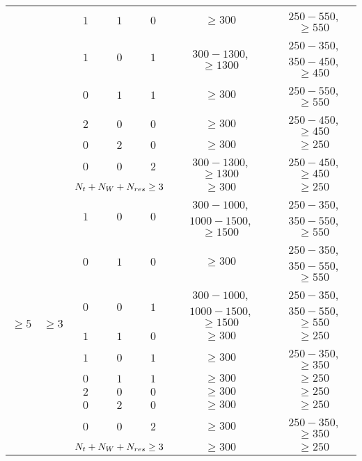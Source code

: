\begin{table}[!ht]
\begin{center}
{\begin{tabular}{|c|c|c|c|c|c|c|}
						  &					   & $1$	 		 & $1$					& $0$			& $\geq300$ 						& $250-550$, $\geq550$ \\
						  &					   & $1$	 		 & $0$					& $1$	  		& $300-1300$, $\geq1300$ & $250-350$, $350-450$, $\geq450$ \\
						  &					   & $0$			 & $1$					& $1$	  		& $\geq300$							& $250-550$, $\geq550$ \\
						  &					   & $2$	 		 & $0$					& $0$			& $\geq300$ 						& $250-450$, $\geq450$ \\
						  &					   & $0$	 		 & $2$					& $0$	  		& $\geq300$ 						& $\geq250$ \\
						  &					   & $0$			 & $0$					& $2$	  		& $300-1300$, $\geq1300$ & $250-450$, $\geq450$ \\
						  &					   & \multicolumn{3}{|c|}{$N_{t}+N_{W}+N_{res}\geq3$} & $\geq300$ 					   & $\geq250$ \\
	\hline
	\multirow{10}{*}{$\geq5$} & \multirow{10}{*}{$\geq3$} & $1$ & $0$ & $0$ & $300-1000$, $1000-1500$, $\geq1500$ & $250-350$, $350-550$, $\geq550$\\
						  &					   & $0$			 & $1$					& $0$			& $\geq300$ 						& $250-350$, $350-550$, $\geq550$\\
						  &					   & $0$			 & $0$				    & $1$	  		& $300-1000$, $1000-1500$, $\geq1500$ & $250-350$, $350-550$, $\geq550$\\
						  &					   & $1$	 		 & $1$					& $0$			& $\geq300$ 						& $\geq250$ \\
						  &					   & $1$	 		 & $0$					& $1$	  		& $\geq300$ 						& $250-350$, $\geq350$ \\
						  &					   & $0$			 & $1$					& $1$	  		& $\geq300$							& $\geq250$ \\
						  &					   & $2$	 		 & $0$					& $0$			& $\geq300$ 						& $\geq250$ \\
						  &					   & $0$	 		 & $2$					& $0$	  		& $\geq300$ 						& $\geq250$ \\
						  &					   & $0$			 & $0$					& $2$	  		& $\geq300$ 					   & $250-350$, $\geq350$ \\
						  &					   & \multicolumn{3}{|c|}{$N_{t}+N_{W}+N_{res}\geq3$} & $\geq300$ 					   & $\geq250$ \\
	\hline
\end{tabular}
}
\end{center}
\end{table}

